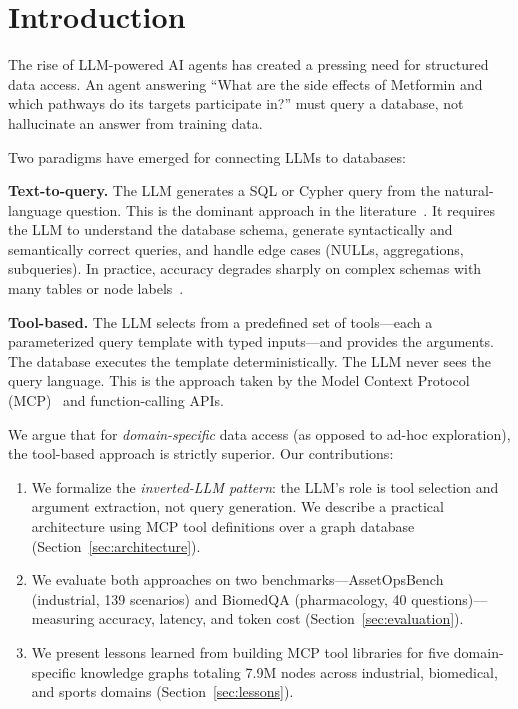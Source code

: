 \documentclass[sigconf]{acmart}
\begin{document}
\maketitle

\section{Introduction}\label{sec:intro}

The rise of LLM-powered AI agents has created a pressing need for
structured data access.  An agent answering ``What are the side
effects of Metformin and which pathways do its targets participate
in?'' must query a database, not hallucinate an answer from
training data.

Two paradigms have emerged for connecting LLMs to databases:

\smallskip\noindent\textbf{Text-to-query.}
The LLM generates a SQL or Cypher query from the natural-language
question.  This is the dominant approach in the
literature~\cite{rajkumar2022text2sql, gao2024texttosql}.
It requires the LLM to understand the database schema, generate
syntactically and semantically correct queries, and handle edge
cases (NULLs, aggregations, subqueries).  In practice,
accuracy degrades sharply on complex schemas with many tables
or node labels~\cite{li2024dawn}.

\smallskip\noindent\textbf{Tool-based.}
The LLM selects from a predefined set of tools---each a
parameterized query template with typed inputs---and provides
the arguments.  The database executes the template deterministically.
The LLM never sees the query language.  This is the approach
taken by the Model Context Protocol (MCP)~\cite{anthropic2024mcp}
and function-calling APIs.

We argue that for \emph{domain-specific} data access (as opposed
to ad-hoc exploration), the tool-based approach is strictly
superior.  Our contributions:

\begin{enumerate}
\item We formalize the \emph{inverted-LLM pattern}: the LLM's
  role is tool selection and argument extraction, not query
  generation.  We describe a practical architecture using
  MCP tool definitions over a graph database
  (Section~\ref{sec:architecture}).

\item We evaluate both approaches on two benchmarks---AssetOpsBench
  (industrial, 139 scenarios) and BiomedQA (pharmacology,
  40 questions)---measuring accuracy, latency, and token cost
  (Section~\ref{sec:evaluation}).

\item We present lessons learned from building MCP tool libraries
  for five domain-specific knowledge graphs totaling 7.9M nodes
  across industrial, biomedical, and sports domains
  (Section~\ref{sec:lessons}).
\end{enumerate}
\end{document}
